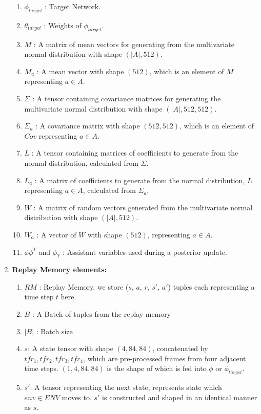 \documentclass{article}
\begin{document}
\begin{enumerate}
\begin{enumerate}
        \item$\phi_{target}$ : Target Network.
        \item$\theta_{target}$ : Weights of $\phi_{target}$.
        \item$M$ : A matrix of mean vectors for generating from the multivariate normal distribution with shape $(|A|, 512)$.
        \item$M_a$ : A mean vector with shape $(512)$, which is an element of $M$ representing $a \in A$.
        \item$\Sigma$ : A tensor containing covariance matrices for generating the multivariate normal distribution with shape $(|A|, 512, 512)$.
        \item$\Sigma_a$ : A covariance matrix with shape $(512,512)$, which is an element of $Cov$ representing $a \in A$.
        \item$L$ : A tensor containing matrices of coefficients to generate from the normal distribution, calculated from $\Sigma$.
        \item$L_a$ : A matrix of coefficients to generate from the normal distribution, $L$ representing $a \in A$, calculated from $\Sigma_a$.
        \item$W$ : A matrix of random vectors generated from the multivariate normal distribution with shape $(|A|, 512)$.
        \item$W_a$ : A vector of $W$ with shape $(512)$, representing $a \in A$.
        \item$\phi\phi^T$ and $\phi_Y$ : Assistant variables used during a posterior update.
    \end{enumerate}
    \item\textbf{Replay Memory elements:}
    \begin{enumerate}
        \item$RM$ : Replay Memory, we store ($s$, $a$, $r$, $s'$, $a'$) tuples each representing a time step $t$ here.
        \item$B$ : A Batch of tuples from the replay memory
        \item$|B|$ : Batch size
        \item$s$: A state tensor with shape $(4,84,84)$, concatenated by $tfr_1, tfr_2, tfr_3, tfr_4$, which are pre-processed frames from four adjacent time steps. $(1,4,84,84)$ is the shape of which is fed into $\phi$ or $\phi_{target}$.
        \item$s'$: A tensor representing the next state, represents state which $env \in ENV$ moves to. $s'$ is constructed and shaped in an identical manner as $s$.

\end{enumerate}
\end{enumerate}
\end{document}
